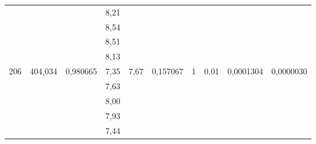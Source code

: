 \documentclass[a4paper, 12pt]{article}
\begin{document}
\begin{table}[h!]
\begin{tabular}{|c|c|c|c|c|c|c|c|c|c|}
                     &                           &                           & 8,21  &                                &                                   &                    &                       &                            &                              \\ \cline{4-4}
                     &                           &                           & 8,54  &                                &                                   &                    &                       &                            &                              \\ \cline{4-4}
                     &                           &                           & 8,51  &                                &                                   &                    &                       &                            &                              \\ \cline{4-4}
                     &                           &                           & 8,13  &                                &                                   &                    &                       &                            &                              \\ \hline
\multirow{5}{*}{206} & \multirow{5}{*}{404,034}  & \multirow{5}{*}{0,980665} & 7,35  & \multirow{5}{*}{7,67}          & \multirow{5}{*}{0,157067}         & \multirow{5}{*}{1} & \multirow{5}{*}{0,01} & \multirow{5}{*}{0,0001304} & \multirow{5}{*}{0,0000030}   \\ \cline{4-4}
                     &                           &                           & 7,63  &                                &                                   &                    &                       &                            &                              \\ \cline{4-4}
                     &                           &                           & 8,00  &                                &                                   &                    &                       &                            &                              \\ \cline{4-4}
                     &                           &                           & 7,93  &                                &                                   &                    &                       &                            &                              \\ \cline{4-4}
                     &                           &                           & 7,44  &                                &                                   &                    &                       &                            &                              \\ \hline

\end{tabular}
\end{table}
\end{document}
